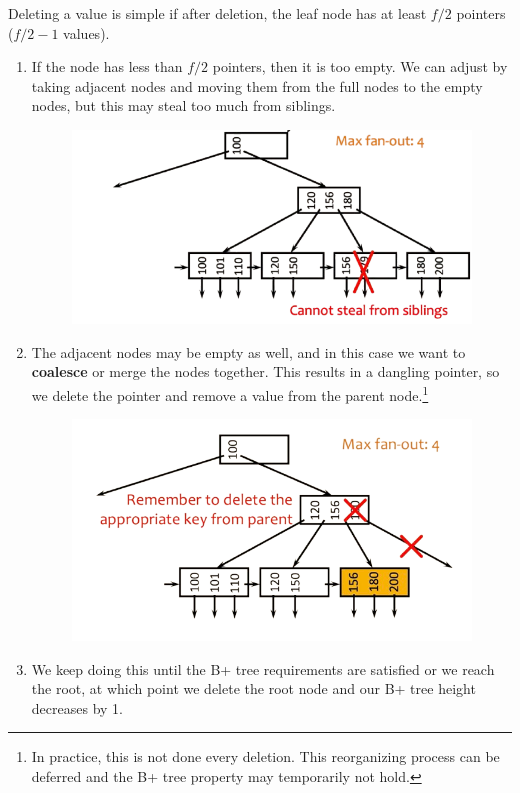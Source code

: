     \begin{algo}[Deletion]
      Deleting a value is simple if after deletion, the leaf node has at least $f/2$ pointers ($f/2 - 1$ values). 
      
      \begin{enumerate}
        \item If the node has less than $f/2$ pointers, then it is too empty. We can adjust by taking adjacent nodes and moving them from the full nodes to the empty nodes, but this may steal too much from siblings. 

        \begin{figure}[H]
          \centering 
          \includegraphics[scale=0.4]{img/deletion_1.png}
          \caption{} 
          \label{fig:deletion_1}
        \end{figure}

        \item The adjacent nodes may be empty as well, and in this case we want to \textbf{coalesce} or merge the nodes together. This results in a dangling pointer, so we delete the pointer and remove a value from the parent node.\footnote{In practice, this is not done every deletion. This reorganizing process can be deferred and the B+ tree property may temporarily not hold.} 

        \begin{figure}[H]
          \centering 
          \includegraphics[scale=0.4]{img/deletion_2.png}
          \caption{} 
          \label{fig:deletion_2}
        \end{figure}

        \item We keep doing this until the B+ tree requirements are satisfied or we reach the root, at which point we delete the root node and our B+ tree height decreases by 1. 
      \end{enumerate}
    \end{algo}

